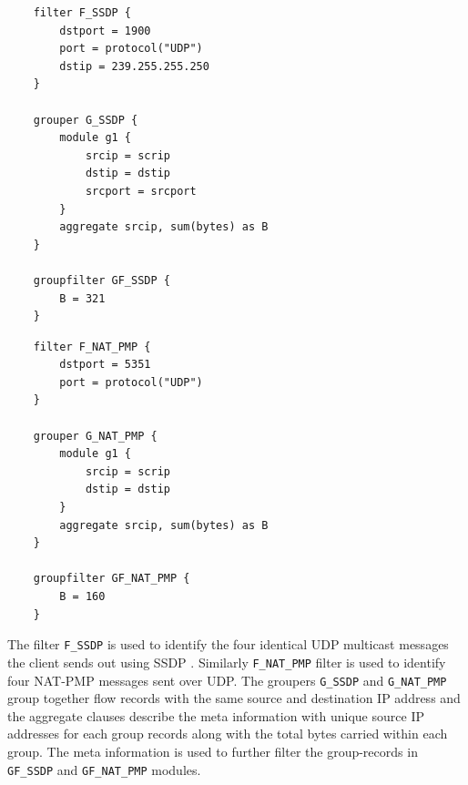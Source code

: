 \begin{center}
\begin{minipage}{.44\textwidth}
	\begin{lstlisting}
	filter F_SSDP {
		dstport = 1900
		port = protocol("UDP")
		dstip = 239.255.255.250
	}

	grouper G_SSDP {
		module g1 {
			srcip = scrip
			dstip = dstip
			srcport = srcport
		}
		aggregate srcip, sum(bytes) as B
	}

	groupfilter GF_SSDP {
		B = 321
	}
	\end{lstlisting}
\end{minipage}
\hfill
\begin{minipage}{.44\textwidth}
	\begin{lstlisting}
	filter F_NAT_PMP {
		dstport = 5351
		port = protocol("UDP")
	}

	grouper G_NAT_PMP {
		module g1 {
			srcip = scrip
			dstip = dstip
		}
		aggregate srcip, sum(bytes) as B
	}

	groupfilter GF_NAT_PMP {
		B = 160
	}
	\end{lstlisting}
\end{minipage}
\end{center}
The filter \texttt{F\_SSDP} is used to identify the four identical \ac{UDP} multicast messages the client sends out using \ac{SSDP} \cite{mbodlaender:2005}. Similarly \texttt{F\_NAT\_PMP} filter is used to identify four \ac{NAT-PMP} \cite{draft-cheshire-nat-pmp-03} messages sent over UDP. The groupers \texttt{G\_SSDP} and \texttt{G\_NAT\_PMP} group together flow records  with the same source and destination IP address and the aggregate clauses describe the meta information with unique source IP addresses for each group records along with the total bytes carried within each group. The meta information is used to further filter the group-records in \texttt{GF\_SSDP} and \texttt{GF\_NAT\_PMP} modules.

